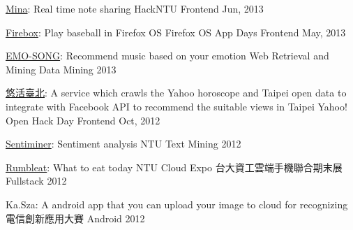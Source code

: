 \begin{cvhonors}
  \cvhonor
    {\href{http://minna.herokuapp.com}{Mina}: \textmd{Real time note sharing}} %
    {HackNTU} %
    {Frontend} %
    {Jun, 2013} %

  \cvhonor
    {\href{http://firebox.herokuapp.com}{Firebox}: \textmd{Play baseball in Firefox OS}} %
    {Firefox OS App Days} %
    {Frontend} %
    {May, 2013} %


  \cvhonor
    {\href{http://emo-song.herokuapp.com}{EMO-SONG}: \textmd{Recommend music based on your emotion}} %
    {Web Retrieval and Mining} %
    {Data Mining} %
    {2013} %

  \cvhonor
    {\href{http://yoho-taipei.herokuapp.com}{悠活臺北}: \textmd{A service which crawls the Yahoo horoscope and Taipei open data to integrate with Facebook API to recommend the suitable views in Taipei}} %
    {Yahoo! Open Hack Day} %
    {Frontend} %
    {Oct, 2012} %

  \cvhonor
    {\href{https://sentiminer.herokuapp.com}{Sentiminer}: \textmd{Sentiment analysis}} %
    {NTU} %
    {Text Mining} %
    {2012} %

  \cvhonor
    {\href{http://rumbleat.herokuapp.com/}{Rumbleat}: \textmd{What to eat today}} %
    {NTU Cloud Expo 台大資工雲端手機聯合期末展} %
    {Fullstack} %
    {2012} %

  \cvhonor
    {Ka.Sza: \textmd{A android app that you can upload your image to cloud for recognizing}} %
    {電信創新應用大賽} %
    {Android} %
    {2012} %



\end{cvhonors}


